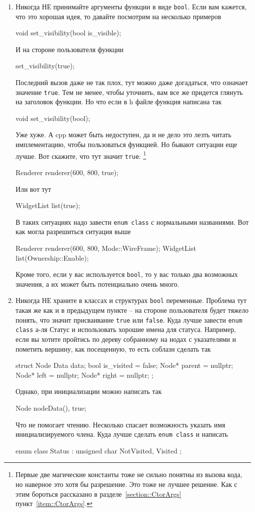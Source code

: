 \begin{enumerate}
\item Никогда НЕ принимайте аргументы функции в виде \verb"bool".
Если вам кажется, что это хорошая идея, то давайте посмотрим на несколько примеров
\begin{cppcode}
void set_visibility(bool is_visible);
\end{cppcode}
И на стороне пользователя функции
\begin{cppcode}
set_visibility(true);
\end{cppcode}
Последний вызов даже не так плох, тут можно даже догадаться, что означает значение \verb"true".
Тем не менее, чтобы уточнить, вам все же придется глянуть на заголовок функции.
Но что если в h файле функция написана так
\begin{cppcode}
void set_visibility(bool);
\end{cppcode}
Уже хуже.
А cpp может быть недоступен, да и не дело это лезть читать имплементацию, чтобы пользоваться функцией.
Но бывают ситуации еще лучше.
Вот скажите, что тут значит \verb"true":%
\footnote{Первые две магические константы тоже не сильно понятны из вызова кода, но наверное это хотя бы разрешение.
Это тоже не лучшее решение.
Как с этим бороться рассказано в разделе~\ref{section::CtorArgs} пункт~\ref{item::CtorArgs}.}
\begin{cppcode}
Renderer renderer(600, 800, true);
\end{cppcode}
Или вот тут
\begin{cppcode}
WidgetList list(true);
\end{cppcode}
В таких ситуациях надо завести \verb"enum class" с нормальными названиями.
Вот как могла разрешиться ситуация выше
\begin{cppcode}
Renderer renderer(600, 800, Mode::WireFrame);
WidgetList list(Ownership::Enable);
\end{cppcode}
Кроме того, если у вас используется \verb"bool", то у вас только два возможных значения, а их может быть потенциально очень много.

\item Никогда НЕ храните в классах и структурах \verb"bool" переменные.
Проблема тут такая же как и в предыдущем пункте -- на стороне пользователя будет тяжело понять, что значит присваивание \verb"true" или \verb"false".
Куда лучше завести \verb"enum class" а-ля Статус и использовать хорошие имена для статуса.
Например, если вы хотите пройтись по дереву собранному на нодах с указателями и пометить вершину, как посещенную, то есть соблазн сделать так
\begin{cppcode}
struct Node {
  Data data;
  bool is_visited = false;
  Node* parent = nullptr;
  Node* left = nullptr;
  Node* right = nullptr;
};
\end{cppcode}
Однако, при инициализации можно написать так
\begin{cppcode}
Node node{Data(), true};
\end{cppcode}
Что не помогает чтению.
Несколько спасает возможность указать имя инициализируемого члена.
Куда лучше сделать \verb"enum class" и написать
\begin{cppcode}
enum class Status : unsigned char {
  NotVisited, Visited
};


\end{cppcode}
\end{enumerate}
